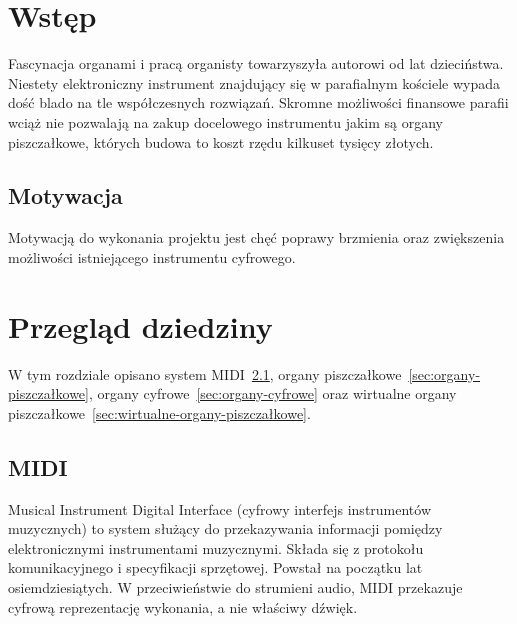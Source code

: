 \documentclass[11pt]{report}
\begin{document}
    \begin{titlepage}
        \centering
        \vspace{0.05\textheight}
        \vspace{0.06\textheight}
        \vspace{0.5\textheight}
        \vspace{0.03\textheight}
    \end{titlepage}

    \tableofcontents


    \chapter{Wstęp}\label{ch:wstęp}
    Fascynacja organami i pracą organisty towarzyszyła autorowi od lat dzieciństwa.
    Niestety elektroniczny instrument znajdujący się w parafialnym kościele wypada dość blado na tle współczesnych rozwiązań.
    Skromne możliwości finansowe parafii wciąż nie pozwalają na zakup docelowego instrumentu jakim są organy piszczałkowe, których budowa to koszt rzędu kilkuset tysięcy złotych.


    \section{Motywacja}
    Motywacją do wykonania projektu jest chęć poprawy brzmienia oraz zwiększenia możliwości istniejącego instrumentu cyfrowego.


    \chapter{Przegląd dziedziny}
    W tym rozdziale opisano system MIDI~\ref{sec:midi}, organy piszczałkowe~\ref{sec:organy-piszczałkowe}, organy cyfrowe~\ref{sec:organy-cyfrowe}
    oraz wirtualne organy piszczałkowe~\ref{sec:wirtualne-organy-piszczałkowe}.


    \section{MIDI}\label{sec:midi}
    Musical Instrument Digital Interface (cyfrowy interfejs instrumentów muzycznych) to system służący do przekazywania informacji pomiędzy elektronicznymi instrumentami muzycznymi.
    Składa się z protokołu komunikacyjnego i specyfikacji sprzętowej.
    Powstał na początku lat osiemdziesiątych.
    W przeciwieństwie do strumieni audio, MIDI przekazuje cyfrową reprezentację wykonania, a nie właściwy dźwięk.
\end{document}
